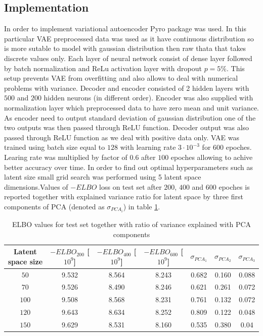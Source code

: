 \documentclass[12pt,a4paper]{article}
\begin{document}
\subsection{Implementation}
In order to implement variational autoencoder Pyro package was used. In this particular VAE preprocessed data was used as it have continuous distribution so 
is more sutable to model with gaussian distribution then raw thata that takes discrete values only. Each layer of neural network consist of dense layer followed
by batch normalization and ReLu activation layer with dropout $p=5\%$. This setup prevents VAE from overfitting and also allows to deal with numerical
problems with variance. Decoder and encoder consisted of 2 hidden layers with $500$ and $200$ hidden neurons (in different order). Encoder was also supplied with
normalization layer which preprocessed data to have zero mean and unit variance. As encoder need to output standard deviation of gaussian distribution one of the 
two outputs was then passed through ReLU function. Decoder output was also passed through ReLU function
as we deal with positive data only. VAE was trained using batch size equal to $128$ with learning rate $3\cdot10^{-3}$ for $600$ epoches. Learing rate was multiplied by factor of $0.6$ after $100$ epoches allowing
to achive better accuracy over time. In order to find out optimal hyperparameters such as latent size  small grid search was performed using 5 latent
space dimensions.Values of  $-ELBO$ loss on test set  after $200$, $400$ and $600$ epoches is reported together with explained variance ratio for latent space by three first components
of PCA (denoted as $\sigma_{PCA_i}$) in table \ref{table:gauss}. 
\begin{center}
    \begin{table}[H]
    \begin{tabular}{ |c| c| c |c |c |c| c| }
    \hline \hline
     Latent space size & $-ELBO_{200}$ [$10^9$] & $-ELBO_{400}$ [$10^9$] & $-ELBO_{600}$ [$10^9$] & $\sigma_{PCA_1}$ &$\sigma_{PCA_2}$ &$\sigma_{PCA_3}$ \\    
    \hline \hline
    $50$ & 9.532 &8.564 &8.243& 0.682 & 0.160 & 0.088 \\ 
    \hline
    $70$ & 9.526 &8.490 & 8.246& 0.621 & 0.261 & 0.072 \\
    \hline
    $100$ & 9.508 & 8.568& 8.231 & 0.761 & 0.132 &0.072\\
    \hline
    $120$ & 9.643 & 8.634& 8.252 & 0.809 & 0.122 &0.048\\
    \hline
    $150$ & 9.629 & 8.531 & 8.160 & 0.535 & 0.380 &0.04\\
    \hline \hline
\end{tabular}
\caption{ELBO values for test set together with ratio of variance explained with PCA components}\label{table:gauss}
\end{table}
\end{center}
\end{document}
